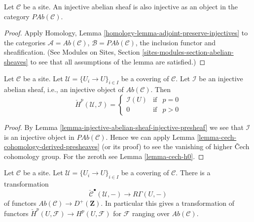 \begin{lemma}
\label{lemma-injective-abelian-sheaf-injective-presheaf}
Let $\mathcal{C}$ be a site. An injective abelian sheaf is also injective as an
object in the category $\textit{PAb}(\mathcal{C})$.
\end{lemma}

\begin{proof}
Apply Homology, Lemma \ref{homology-lemma-adjoint-preserve-injectives}
to the categories $\mathcal{A} = \textit{Ab}(\mathcal{C})$,
$\mathcal{B} = \textit{PAb}(\mathcal{C})$, the inclusion functor
and sheafification. (See
Modules on Sites, Section \ref{sites-modules-section-abelian-sheaves} to see
that all assumptions of the lemma are satisfied.)
\end{proof}

\begin{lemma}
\label{lemma-injective-trivial-cech}
Let $\mathcal{C}$ be a site.
Let $\mathcal{U} = \{U_i \to U\}_{i \in I}$ be a covering of $\mathcal{C}$.
Let $\mathcal{I}$ be an injective abelian sheaf, i.e., an injective
object of $\textit{Ab}(\mathcal{C})$.
Then
$$
\check{H}^p(\mathcal{U}, \mathcal{I}) =
\left\{
\begin{matrix}
\mathcal{I}(U) & \text{if} & p = 0 \\
0 & \text{if} & p > 0
\end{matrix}
\right.
$$
\end{lemma}

\begin{proof}
By Lemma \ref{lemma-injective-abelian-sheaf-injective-presheaf}
we see that $\mathcal{I}$ is an injective object in
$\textit{PAb}(\mathcal{C})$.
Hence we can apply Lemma \ref{lemma-cech-cohomology-derived-presheaves}
(or its proof) to see the vanishing of higher {\v C}ech cohomology group.
For the zeroth see Lemma \ref{lemma-cech-h0}.
\end{proof}

\begin{lemma}
\label{lemma-cech-cohomology}
Let $\mathcal{C}$ be a site.
Let $\mathcal{U} = \{U_i \to U\}_{i \in I}$ be a covering of $\mathcal{C}$.
There is a transformation
$$
\check{\mathcal{C}}^\bullet(\mathcal{U}, -)
\longrightarrow
R\Gamma(U, -)
$$
of functors
$\textit{Ab}(\mathcal{C}) \to D^{+}(\mathbf{Z})$.
In particular this gives a transformation of functors
$\check{H}^p(U, \mathcal{F}) \to H^p(U, \mathcal{F})$ for
$\mathcal{F}$ ranging over $\textit{Ab}(\mathcal{C})$.
\end{lemma}

